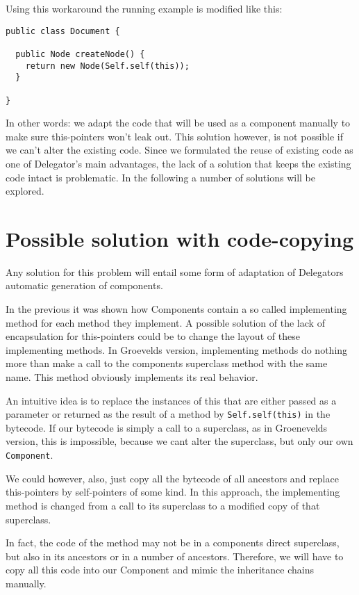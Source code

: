 \documentclass[a4paper,12pt]{book}
\begin{document}
Using this workaround the running example is modified like this:

\begin{verbatim}
public class Document {

  public Node createNode() {
    return new Node(Self.self(this));
  }

}
\end{verbatim}

In other words: we adapt the code that will be used as a component manually to make sure this-pointers won't leak out. This solution however, is not possible if we can't alter the existing code. Since we formulated the reuse of existing code as one of Delegator's main advantages, the lack of a solution that keeps the existing code intact is problematic. In the following a number of solutions will be explored.

\section*{Possible solution with code-copying}
Any solution for this problem will entail some form of adaptation of Delegators automatic generation of components.

In the previous it was shown how Components contain a so called implementing method for each method they implement. A possible solution of the lack of encapsulation for this-pointers could be to change the layout of these implementing methods. In Groevelds version, implementing methods do nothing more than make a call to the components superclass method with the same name. This method obviously implements its real behavior.

An intuitive idea is to replace the instances of this that are either passed as a parameter or returned as the result of a method by \verb|Self.self(this)| in the bytecode. If our bytecode is simply a call to a superclass, as in Groenevelds version, this is impossible, because we cant alter the superclass, but only our own \verb|Component|.

We could however, also, just copy all the bytecode of all ancestors and replace this-pointers by self-pointers of some kind. In this approach, the implementing method is changed from a call to its superclass to a modified copy of that superclass.

In fact, the code of the method may not be in a components direct superclass, but also in its ancestors or in a number of ancestors. Therefore, we will have to copy all this code into our Component and mimic the inheritance chains manually.
\end{document}
